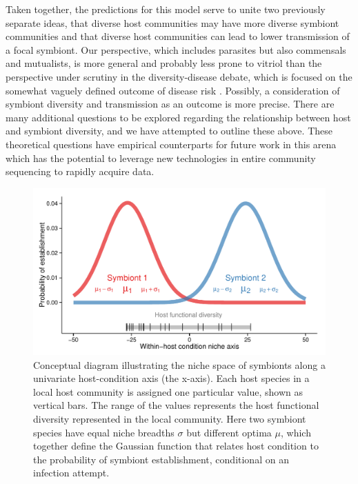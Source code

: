 Taken together, the predictions for this model serve to unite two previously separate ideas, that diverse host communities may have more diverse symbiont communities and that diverse host communities can lead to lower transmission of a focal symbiont.
Our perspective, which includes parasites but also commensals and mutualists, is more general and probably less prone to vitriol than the perspective under scrutiny in the diversity-disease debate, which is focused on the somewhat vaguely defined outcome of disease risk \citep{Ostfeld2003}.
Possibly, a consideration of symbiont diversity and transmission as an outcome is more precise.
There are many additional questions to be explored regarding the relationship between host and symbiont diversity, and we have attempted to outline these above.
These theoretical questions have empirical counterparts for future work in this arena which has the potential to leverage new technologies in entire community sequencing to rapidly acquire data.

\begin{figure}[ht]\centering
\includegraphics[width=\linewidth]{figs/ch6/niche.pdf}
\caption[Niche space for symbionts]{Conceptual diagram illustrating the niche space of symbionts along a univariate host-condition axis (the x-axis). Each host species in a local host community is assigned one particular value, shown as vertical bars. The range of the values represents the host functional diversity represented in the local community. Here two symbiont species have equal niche breadths $\sigma$ but different optima $\mu$, which together define the Gaussian function that relates host condition to the probability of symbiont establishment, conditional on an infection attempt.}
\label{fig:niche}
\end{figure}

